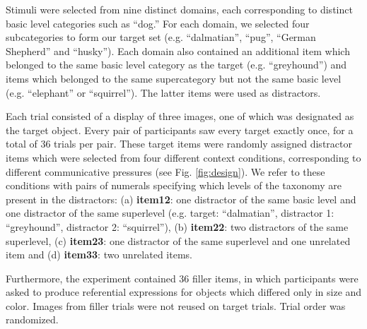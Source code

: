 \documentclass[10pt,letterpaper]{article}
\begin{document}
Stimuli were selected from nine distinct domains, each corresponding to distinct basic level categories such as ``dog.'' For each domain, we selected four subcategories to form our target set (e.g. ``dalmatian'', ``pug'', ``German Shepherd'' and ``husky''). Each domain also contained an additional item which belonged to the same basic level category as the target (e.g. ``greyhound'') and items which belonged to the same supercategory but not the same basic level (e.g. ``elephant'' or ``squirrel''). The latter items were used as distractors.

Each trial consisted of a display of three images, one of which was designated as the target object. Every pair of participants saw every target exactly once, for a total of 36 trials per pair. These target items were randomly assigned distractor items which were selected from four different context conditions, corresponding to different communicative pressures (see Fig. \ref{fig:design}). We refer to these conditions with pairs of numerals specifying which levels of the taxonomy are present in the distractors: (a) \textbf{item12}: one distractor of the same basic level and one distractor of the same superlevel (e.g. target: ``dalmatian'', distractor 1: ``greyhound'', distractor 2: ``squirrel''), (b) \textbf{item22}: two distractors of the same superlevel, (c) \textbf{item23}: one distractor of the same superlevel and one unrelated item and (d) \textbf{item33}: two unrelated items.


Furthermore, the experiment contained 36 filler items, in which participants were asked to produce referential expressions for objects which differed only in size and color. Images from filler trials were not reused on target trials. Trial order was randomized. 
\end{document}
